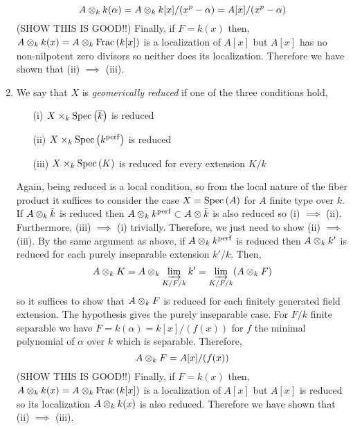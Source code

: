 \documentclass[12pt]{article}
\begin{document}
\begin{enumerate}
\[ A \otimes_k k(\alpha) = A \otimes_k k[x]/(x^p - \alpha) = A[x]/(x^p - \alpha) \]
(SHOW THIS IS GOOD!!)
Finally, if $F = k(x)$ then, $A \otimes_k k(x) = A \otimes_k \mathrm{Frac}\left(k[x]\right)$ is a localization of $A[x]$ but $A[x]$ has no non-nilpotent zero divisors so neither does its localization. Therefore we have shown that (ii) $\implies$ (iii).

\newcommand{\perf}{\mathrm{perf}}

\item We say that $X$ is \textit{geomerically reduced} if one of the three conditions hold,
\begin{enumerate}
\item[(i)] $X \times_k \mathrm{Spec}\left( \overline{k} \right)$ is reduced
\item[(ii)] $X \times_k \Spec{k^{\perf}}$ is reduced
\item[(iii)] $X \times_k \mathrm{Spec}\left( K \right)$ is reduced for every extension $K / k$
\end{enumerate}
Again, being reduced is a local condition, so from the local nature of the fiber product it suffices to consider the case $X = \mathrm{Spec}\left( A \right)$ for $A$ finite type over $k$. If $A \otimes_k \bar{k}$ is reduced then $A \ot_k k^{\perf} \subset A \ot \bar{k}$ is also reduced so (i) $\implies$ (ii). Furthermore, (iii) $\implies$ (i) trivially. Therefore, we just need to show (ii) $\implies$ (iii). By the same argument as above, if $A \ot_k k^\perf$ is reduced then $A \otimes_k k'$ is reduced for each purely inseparable extension $k'/k$. Then,
\[ A \otimes_k K = A \otimes_k \varinjlim_{K/F/k} k' = \varinjlim_{K/F/k} (A \otimes_k F) \]
so it suffices to show that $A \otimes_k F$ is reduced for each finitely generated field extension. The hypothesis gives the purely inseparable case. For $F/k$ finite separable we have $F = k(\alpha) = k[x]/(f(x))$ for $f$ the minimal polynomial of $\alpha$ over $k$ which is separable. Therefore,
\[ A \otimes_k F = A[x]/(f(x)) \]
(SHOW THIS IS GOOD!!)
Finally, if $F = k(x)$ then, $A \otimes_k k(x) = A \otimes_k \mathrm{Frac}\left(k[x]\right)$ is a localization of $A[x]$ but $A[x]$ is reduced so its localization $A \otimes_k k(x)$ is also reduced. Therefore we have shown that (ii) $\implies$ (iii).


\end{enumerate}
\end{document}
